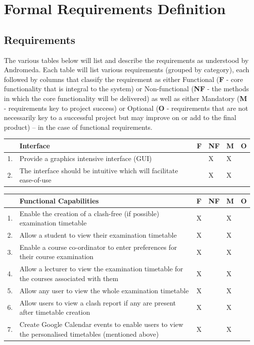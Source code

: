 \documentclass{article}
\begin{document}
\section{Formal Requirements Definition}

\subsection{Requirements}

The various tables below will list and describe the requirements as understood by Andromeda. Each table will list various requirements (grouped by category), each followed by columns that classify the requirement as either Functional (\textbf{F} - core functionality that is integral to the system) or Non-functional (\textbf{NF} - the methods in which the core functionality will be delivered) as well as either Mandatory (\textbf{M} - requirements key to project success) or Optional (\textbf{O} - requirements that are not necessarily key to a successful project but may improve on or add to the final product) – in the case of functional requirements.

\begin{center}
\begin{tabular}{|m{1cm}|m{10cm}|m{1cm}|m{1cm}|m{1cm}|m{1cm}|}
\hline
 & \textbf{Interface} & \textbf{F} & \textbf{NF} & \textbf{M} & \textbf{O} \\
\hline
1. & {Provide a graphics intensive interface (GUI)} & & X & X & \\
\hline
2. & {The interface should be intuitive which will facilitate ease-of-use} & & X & X & \\

\hline
\end{tabular}
\end{center}

\begin{center}
\begin{tabular}{|m{1cm}|m{10cm}|m{1cm}|m{1cm}|m{1cm}|m{1cm}|}
\hline
 & \textbf{Functional Capabilities} & \textbf{F} & \textbf{NF} & \textbf{M} & \textbf{O} \\
\hline
1. & {Enable the creation of a clash-free (if possible) examination timetable} & X & & X & \\
\hline
2. & {Allow a student to view their examination timetable} & X & & X & \\
\hline
3. & {Enable a course co-ordinator to enter preferences for their course examination} & X & & X & \\
\hline
4. & {Allow a lecturer to view the examination timetable for the courses associated with them} & X & & X & \\
\hline
5. & {Allow any user to view the whole examination timetable} & X & & X & \\
\hline
6. & {Allow users to view a clash report if any are present after timetable creation} & X & & X & \\
\hline
7. & {Create Google Calendar events to enable users to view the personalised timetables (mentioned above)} & X & & X & \\
\hline
\end{tabular}
\end{center}
\end{document}

